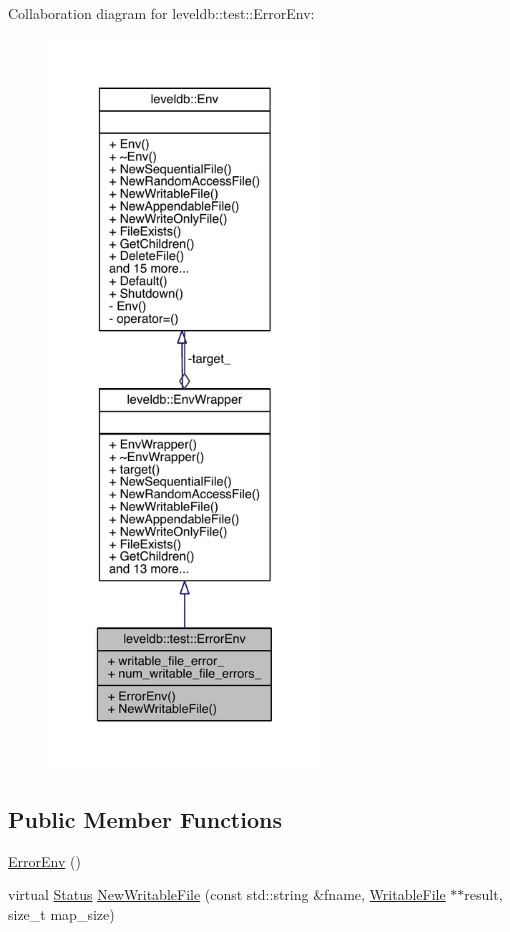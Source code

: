 Collaboration diagram for leveldb\+:\+:test\+:\+:Error\+Env\+:\nopagebreak
\begin{figure}[H]
\begin{center}
\leavevmode
\includegraphics[height=550pt]{classleveldb_1_1test_1_1_error_env__coll__graph}
\end{center}
\end{figure}
\subsection*{Public Member Functions}
\begin{DoxyCompactItemize}
\item 
\hyperlink{classleveldb_1_1test_1_1_error_env_aa9d0985b519b252aec24cca8fe89c8b7}{Error\+Env} ()
\item 
virtual \hyperlink{classleveldb_1_1_status}{Status} \hyperlink{classleveldb_1_1test_1_1_error_env_a6f1f7633afd96bac9da744bc547e841e}{New\+Writable\+File} (const std\+::string \&fname, \hyperlink{classleveldb_1_1_writable_file}{Writable\+File} $\ast$$\ast$result, size\+\_\+t map\+\_\+size)
\end{DoxyCompactItemize}
